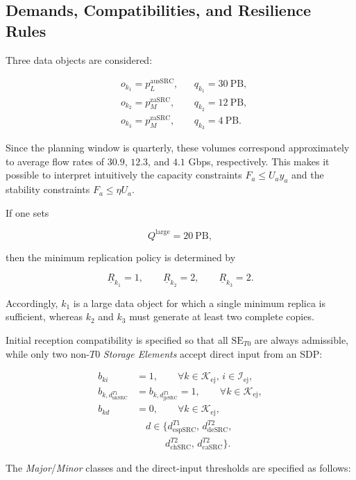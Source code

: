 \documentclass[a4paper,fleqn]{cas-dc}
\newcommand{\Iset}{\mathcal{I}}
\newcommand{\Kset}{\mathcal{K}}
\begin{document}
\subsection{Demands, Compatibilities, and Resilience Rules}

Three data objects are considered:

\begin{align*}
&o_{k_1}=p_L^{\mathrm{ausSRC}}, && q_{k_1}=30\ \text{PB},\\
&o_{k_2}=p_M^{\mathrm{zaSRC}}, && q_{k_2}=12\ \text{PB},\\
&o_{k_3}=p_M^{\mathrm{zaSRC}}, && q_{k_3}=4\ \text{PB}.
\end{align*}


Since the planning window is quarterly, these volumes correspond approximately to average flow rates of \(30.9\), \(12.3\), and \(4.1\) Gbps, respectively. This makes it possible to interpret intuitively the capacity constraints \(F_a\le U_a y_a\) and the stability constraints \(F_a\le \eta U_a\).


If one sets

\[
Q^{\mathrm{large}}=20\ \text{PB},
\]

then the minimum replication policy is determined by

\[
\underline R_{k_1}=1,
\qquad
\underline R_{k_2}=2,
\qquad
\underline R_{k_3}=2.
\]

Accordingly, \(k_1\) is a large data object for which a single minimum replica is sufficient, whereas \(k_2\) and \(k_3\) must generate at least two complete copies.

Initial reception compatibility is specified so that all \(\mathrm{SE}_{T0}\) are always admissible, while only two non-\(T0\) \emph{Storage Elements} accept direct input from an SDP:

\begin{align*}
b_{ki} &= 1, \qquad \forall k\in\Kset_{\mathrm{ej}},\, i\in\Iset_{\mathrm{ej}}, \\[1.5ex]
b_{k,d_{\mathrm{ukSRC}}^{T1}} &= b_{k,d_{\mathrm{jpSRC}}^{T1}}=1, \qquad \forall k\in\Kset_{\mathrm{ej}}, \\[1.5ex]
b_{kd} &= 0, \qquad \forall k\in\Kset_{\mathrm{ej}}, \\
&\quad d\in \bigl\{d_{\mathrm{espSRC}}^{T1},\, d_{\mathrm{deSRC}}^{T2}, \\
&\qquad\quad d_{\mathrm{chSRC}}^{T2},\, d_{\mathrm{caSRC}}^{T2}\bigr\}.
\end{align*}


The \emph{Major}/\emph{Minor} classes and the direct-input thresholds are specified as follows:
\end{document}
